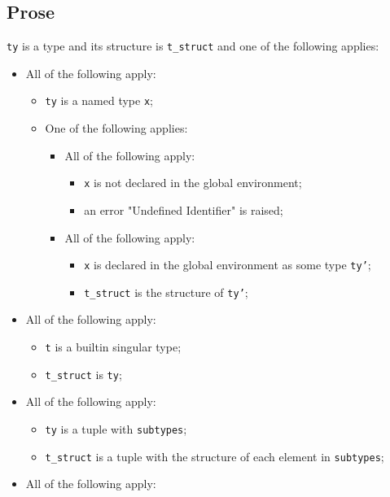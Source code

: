 \documentclass{book}
\begin{document}
    \subsection{Prose}
    \texttt{ty} is a type and its structure is \texttt{t\_struct} and one of the following
    applies:
    \begin{itemize}
    \item All of the following apply:
      \begin{itemize}
      \item \texttt{ty} is a named type \texttt{x};
      \item One of the following applies:
        \begin{itemize}
        \item All of the following apply:
          \begin{itemize}
          \item \texttt{x} is not declared in the global environment; 
          \item an error "Undefined Identifier" is raised;
          \end{itemize}
        \item All of the following apply:
          \begin{itemize}
          \item \texttt{x} is declared in the global environment as some type \texttt{ty'};
          \item \texttt{t\_struct} is the structure of \texttt{ty'};
          \end{itemize}
       \end{itemize}
      \end{itemize}
    \item All of the following apply:
      \begin{itemize}
      \item \texttt{t} is a builtin singular type;
      \item \texttt{t\_struct} is \texttt{ty};
      \end{itemize}
    \item All of the following apply:
      \begin{itemize}
      \item \texttt{ty} is a tuple with \texttt{subtypes};
      \item \texttt{t\_struct} is a tuple with the structure of each element in \texttt{subtypes};
      \end{itemize}
    \item All of the following apply:

\end{itemize}
\end{document}
